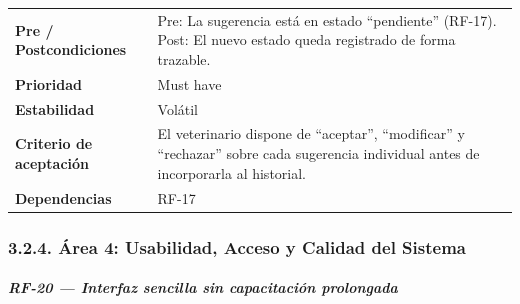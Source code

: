 \documentclass[
]{article}
\begin{document}
{\begin{longtable}[]{|
  >{\raggedright\arraybackslash}p{}|
  >{\raggedright\arraybackslash}p{}|}
\begin{minipage}[t]{\linewidth}
\end{minipage} \\
\hline
\textbf{Pre / Postcondiciones} & \begin{minipage}[t]{\linewidth}\raggedright
Pre: La sugerencia está en estado “pendiente” (RF-17). Post: El nuevo estado queda registrado de forma trazable.
\end{minipage} \\
\hline
\textbf{Prioridad} & \begin{minipage}[t]{\linewidth}\raggedright
Must have
\end{minipage} \\
\hline
\textbf{Estabilidad} & \begin{minipage}[t]{\linewidth}\raggedright
Volátil
\end{minipage} \\
\hline
\textbf{Criterio de aceptación} &
\begin{minipage}[t]{\linewidth}\raggedright
El veterinario dispone de “aceptar”, “modificar” y “rechazar” sobre cada sugerencia individual antes de incorporarla al historial.
\end{minipage} \\
\hline
\textbf{Dependencias} & \begin{minipage}[t]{\linewidth}\raggedright
RF-17
\end{minipage} \\
\hline
\end{longtable}
}

\subsubsection{3.2.4. Área 4: Usabilidad, Acceso y Calidad del Sistema}\label{area-4-usabilidad-acceso}

\subparagraph{RF-20 --- Interfaz sencilla sin capacitación prolongada}\label{rf-20-interfaz-sencilla-sin-capacitaci-n-prolo}
\end{document}
